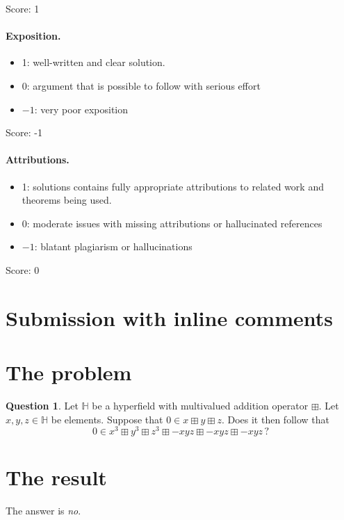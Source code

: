 \documentclass[11pt]{article}
\theoremstyle{definition}
\newtheorem{question}{Question}
\theoremstyle{remark}
\newcommand{\HH}{\mathbb{H}}
\newcommand{\bp}{\boxplus}
\begin{document}
\noindent Score: 1

\paragraph{Exposition.}
\begin{itemize}
	\item  1: well-written and clear solution.
	\item  0: argument that is possible to follow with serious effort
	\item  $-1$: very poor exposition
\end{itemize}

\noindent Score: -1

\paragraph{Attributions.}
\begin{itemize}
	\item  1: solutions contains fully appropriate attributions
		to related work and theorems being used.
	\item  0: moderate issues with missing attributions or hallucinated references
	\item  $-1$: blatant plagiarism or hallucinations
\end{itemize}

\noindent Score: 0

\newpage
\section{Submission with inline comments}


\section{The problem}

\begin{question}\label{ques:main}
Let $\HH$ be a hyperfield with multivalued addition operator $\bp$. Let $x,y,z\in\HH$ be elements. Suppose that $0\in x\bp y\bp z$. Does it then follow that
\[
0\in x^3\bp y^3\bp z^3\bp -xyz\bp -xyz\bp -xyz\,?
\]
\end{question}

\section{The result}

The answer is \emph{no}.
\end{document}
